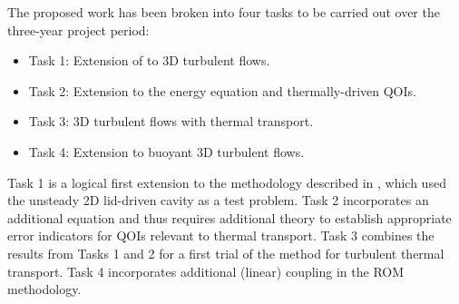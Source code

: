 The proposed work has been broken into four tasks to be carried
out over the three-year project period: \\[-4.0ex]
\begin{itemize}
\item Task 1:  Extension of \cite{fick18} to 3D turbulent flows.
\\[-4.3ex]
\item Task 2:  Extension to the energy equation and thermally-driven QOIs.
\\[-4.3ex]
\item Task 3:  3D turbulent flows with thermal transport.
\\[-4.3ex]
\item Task 4:  Extension to buoyant 3D turbulent flows.
\end{itemize}
Task 1 is a logical first extension to the methodology described in \cite{fick18},
which used the unsteady 2D lid-driven cavity as a test problem.  
Task 2 incorporates an additional equation and thus requires additional
theory to establish appropriate error indicators for QOIs relevant to thermal
transport.
Task 3 combines the results from Tasks 1 and 2 for a first trial of
the method for turbulent thermal transport.
Task 4 incorporates additional (linear) coupling in the ROM methodology.

